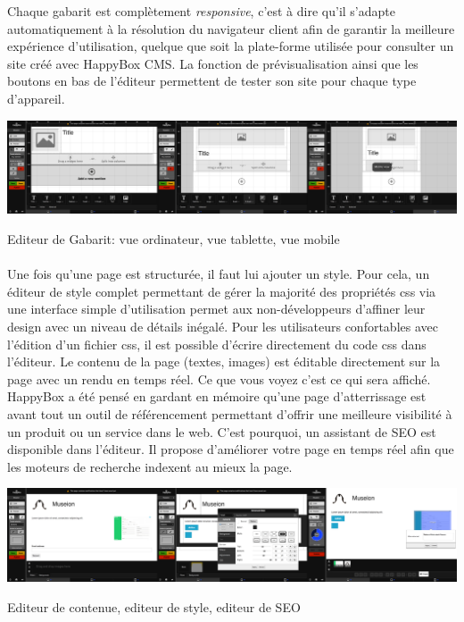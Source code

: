 \documentclass[11pt, a4paper ]{article}
\begin{document}
\begin{spacing}{1.5}
Chaque gabarit est complètement \emph{responsive}, c'est à dire qu'il s'adapte automatiquement à la résolution du navigateur client afin de garantir la meilleure expérience d'utilisation, quelque que soit la plate-forme utilisée pour consulter un site créé avec HappyBox CMS. La fonction de prévisualisation ainsi que les boutons en bas de l'éditeur permettent de tester son site pour chaque type d'appareil.


\begin{center}

		\includegraphics[width=\textwidth]{images/HBscreen/editeurGabarit.png}
		\caption{Editeur de Gabarit: vue ordinateur, vue tablette, vue mobile}

\end{center}

\paragraph{} %
Une fois qu'une page est structurée, il faut lui ajouter un style. Pour cela, un éditeur de style complet permettant de gérer la majorité des propriétés css via une interface simple d'utilisation permet aux non-développeurs d'affiner leur design avec un niveau de détails inégalé. Pour les utilisateurs confortables avec l'édition d'un fichier css, il est possible d'écrire directement du code css dans l'éditeur.
Le contenu de la page (textes, images) est éditable directement sur la page avec un rendu en temps réel. Ce que vous voyez c'est ce qui sera affiché.
HappyBox a été pensé en gardant en mémoire qu'une page d’atterrissage est avant tout un outil de référencement permettant d’offrir une meilleure visibilité à un produit ou un service dans le web. C'est pourquoi, un assistant de SEO est disponible dans l'éditeur. Il propose d'améliorer votre page en temps réel afin que les moteurs de recherche indexent au mieux la page.
\begin{center}
	\includegraphics[width=\textwidth]{images/HBscreen/contenueStyleSeo.png}
	\caption{Editeur de contenue, editeur de style, editeur de SEO}
\end{center}


\end{spacing}
\end{document}
